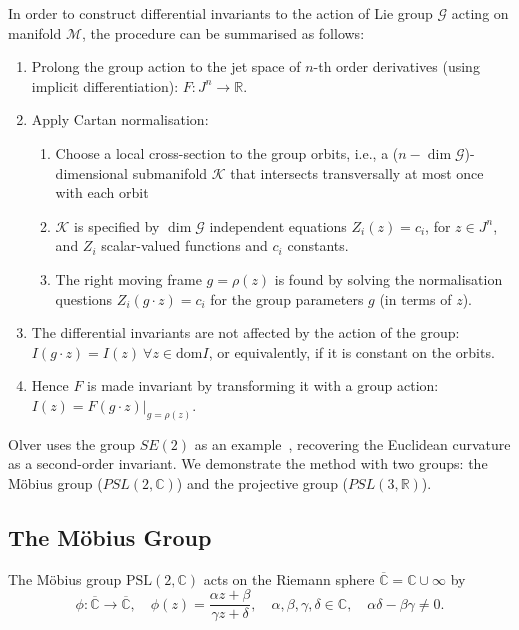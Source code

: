 \documentclass[review,onefignum,onetabnum]{siamonline190516}
\begin{document}
In order to construct differential invariants to the action of Lie group $\mathcal{G}$ acting on manifold $\mathcal{M}$, the procedure can be summarised as follows:

\begin{enumerate}
\item Prolong the group action to the jet space of $n$-th order derivatives (using implicit differentiation): $F: J^n \to \mathbb{R}$. 
\item Apply Cartan normalisation:
    \begin{enumerate}
    \item Choose a local cross-section to the group orbits, i.e., a ($n - \dim \mathcal{G}$)-dimensional submanifold $\mathcal{K}$ that intersects transversally at most once with each orbit
    \item $\mathcal{K}$ is specified by $\dim \mathcal{G}$ independent equations $Z_i (z) = c_i$, for $z \in J^n$,  and $Z_i$ scalar-valued functions and $c_i$ constants.
    \item The right moving frame $g = \rho(z)$ is found by solving the normalisation questions $Z_i (g \cdot z) = c_i$ for the group parameters $g$ (in terms of $z$).
    \end{enumerate}
\item The differential invariants are not affected by the action of the group: $I(g \cdot z) = I(z) \: \forall z \in \mathrm{dom} I$, or equivalently, if it is constant on the orbits. 
\item Hence $F$ is made invariant by transforming it with a group action: $I(z) = F(g \cdot z) |_{g=\rho(z)}$.  
\end{enumerate}

Olver uses the group $SE(2)$ as an example~\cite{Olver}, recovering the Euclidean curvature as a second-order invariant. We demonstrate the method with two groups: the M\"obius group ($PSL(2,\mathbb{C})$) and the projective group ($PSL(3,\mathbb{R})$). 

\subsection{The M\"{o}bius Group}

The M\"obius group $\mathrm{PSL}(2,\mathbb{C})$ acts on the Riemann sphere
$\overline{\mathbb{C}} = \mathbb{C}\cup\infty$ by 
$$ \phi\colon \overline{\mathbb{C}} \to \overline{\mathbb{C}},\quad \phi(z) = \frac{\alpha z + \beta}{\gamma z + \delta},\quad \alpha,\beta,\gamma,\delta\in\mathbb{C}, \quad
\alpha\delta-\beta\gamma\ne 0.$$
\end{document}
